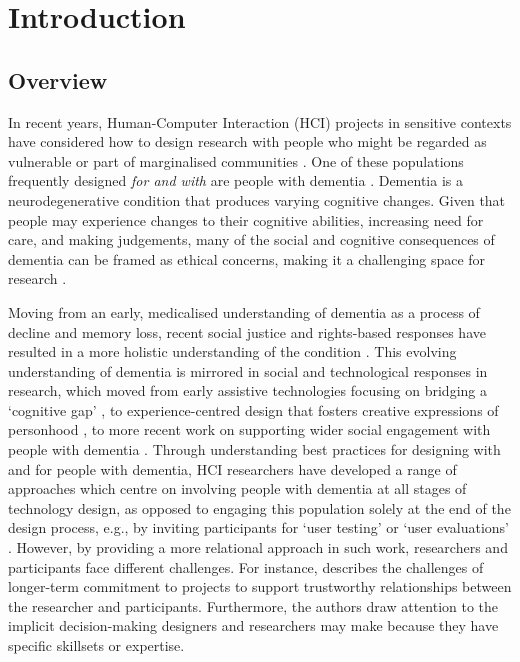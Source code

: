 \chapter{Introduction}

\section{Overview}
\label{Intro: Overiew}
In recent years, Human-Computer Interaction (HCI) projects in sensitive contexts have considered how to design research with people who might be regarded as vulnerable or part of marginalised communities \citep{waycott_challenge_2015}. One of these populations frequently designed \textit{for and with} are people with dementia \citep{suijkerbuijk_active_2019}. Dementia is a neurodegenerative condition that produces varying cognitive changes. Given that people may experience changes to their cognitive abilities, increasing need for care, and making judgements, many of the social and cognitive consequences of dementia can be framed as ethical concerns, making it a challenging space for research \citep{herrmann_systematic_2018}.

Moving from an early, medicalised understanding of dementia as a process of decline and memory loss, recent social justice and rights-based responses have resulted in a more holistic understanding of the condition \citep{shakespeare_rights_2019}. This evolving understanding of dementia is mirrored in social and technological responses in research, which moved from early assistive technologies focusing on bridging a ‘cognitive gap’ \citep{mulvenna_supporting_2010}, to experience-centred design that fosters creative expressions of personhood \citep{morrissey_value_2017}, to more recent work on supporting wider social engagement with people with dementia \citep{foley_care_2019, lazar_safe_2019, welsh_ticket_2018}. Through understanding best practices for designing with and for people with dementia, HCI researchers have developed a range of approaches which centre on involving people with dementia at all stages of technology design, as opposed to engaging this population solely at the end of the design process, e.g., by inviting participants for ‘user testing’ or ‘user evaluations’ \citep{brankaert_intersections_2019,schorch_designing_2016, vines_designing_2013}. However, by providing a more relational approach in such work, researchers and participants face different challenges. For instance, \cite{hendriks_challenges_2014} describes the challenges of longer-term commitment to projects to support trustworthy relationships between the researcher and participants. Furthermore, the authors draw attention to the implicit decision-making designers and researchers may make because they have specific skillsets or expertise.

